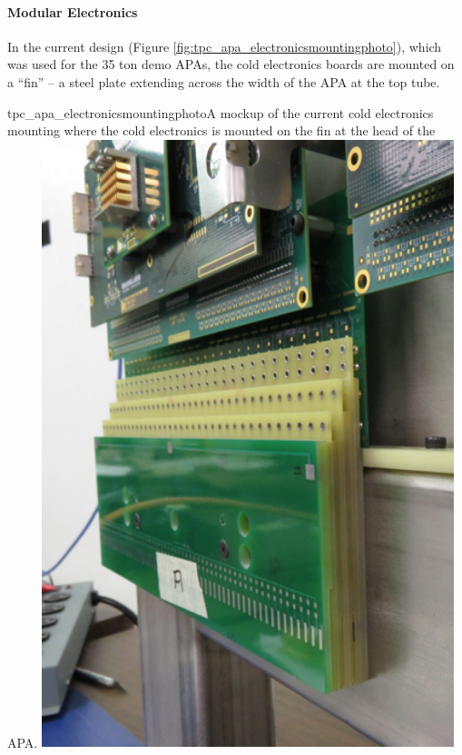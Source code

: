 %
%

\paragraph{Modular Electronics}
In the current design (Figure \ref{fig:tpc_apa_electronicsmountingphoto}), which was used for the 35 ton demo APAs, the cold electronics boards are mounted on a ``fin'' -- a steel plate extending across the width of the APA at the top tube.

\begin{cdrfigure}{tpc_apa_electronicsmountingphoto}{A mockup of the current cold electronics mounting where the cold electronics is mounted on the fin at the head of the APA.}
\includegraphics[width=0.9\textwidth]{figures/tpc_apa_electronicsmountingphoto.png} 
\end{cdrfigure}

